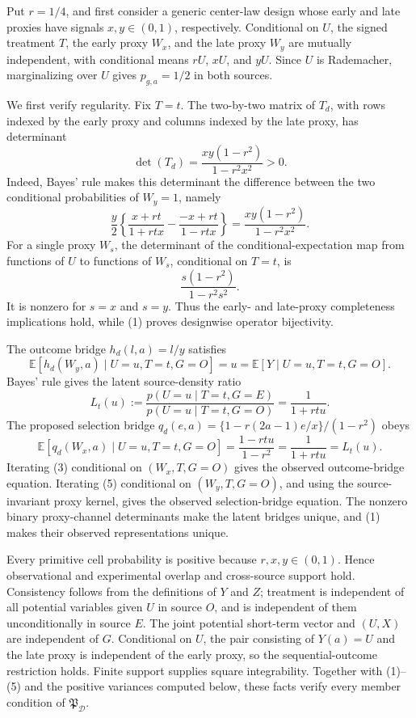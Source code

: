 Put \(r=1/4\), and first consider a generic center-law design whose early and late proxies have signals \(x,y\in(0,1)\), respectively. Conditional on \(U\), the signed treatment \(T\), the early proxy \(W_x\), and the late proxy \(W_y\) are mutually independent, with conditional means \(rU\), \(xU\), and \(yU\). Since \(U\) is Rademacher, marginalizing over \(U\) gives \(p_{g,a}=1/2\) in both sources.

We first verify regularity. Fix \(T=t\). The two-by-two matrix of \(T_d\), with rows indexed by the early proxy and columns indexed by the late proxy, has determinant
\[
 \det(T_d)=\frac{xy(1-r^2)}{1-r^2x^2}>0.                   \tag{1}
\]
Indeed, Bayes' rule makes this determinant the difference between the two conditional probabilities of \(W_y=1\), namely
\[
 \frac y2\left\{
 \frac{x+rt}{1+rtx}-\frac{-x+rt}{1-rtx}
 \right\}
 =\frac{xy(1-r^2)}{1-r^2x^2}.
\]
For a single proxy \(W_s\), the determinant of the conditional-expectation map from functions of \(U\) to functions of \(W_s\), conditional on \(T=t\), is
\[
 \frac{s(1-r^2)}{1-r^2s^2}.                                \tag{2}
\]
It is nonzero for \(s=x\) and \(s=y\). Thus the early- and late-proxy completeness implications hold, while (1) proves designwise operator bijectivity.

The outcome bridge \(h_d(l,a)=l/y\) satisfies
\[
 \mathbb E[h_d(W_y,a)\mid U=u,T=t,G=O]=u
 =\mathbb E[Y\mid U=u,T=t,G=O].                            \tag{3}
\]
Bayes' rule gives the latent source-density ratio
\[
 L_t(u):=\frac{p(U=u\mid T=t,G=E)}{p(U=u\mid T=t,G=O)}
 =\frac1{1+rtu}.                                            \tag{4}
\]
The proposed selection bridge \(q_d(e,a)=\{1-r(2a-1)e/x\}/(1-r^2)\) obeys
\[
 \mathbb E[q_d(W_x,a)\mid U=u,T=t,G=O]
 =\frac{1-rtu}{1-r^2}
 =\frac1{1+rtu}=L_t(u).                                     \tag{5}
\]
Iterating (3) conditional on \((W_x,T,G=O)\) gives the observed outcome-bridge equation. Iterating (5) conditional on \((W_y,T,G=O)\), and using the source-invariant proxy kernel, gives the observed selection-bridge equation. The nonzero binary proxy-channel determinants make the latent bridges unique, and (1) makes their observed representations unique.

Every primitive cell probability is positive because \(r,x,y\in(0,1)\). Hence observational and experimental overlap and cross-source support hold. Consistency follows from the definitions of \(Y\) and \(Z\); treatment is independent of all potential variables given \(U\) in source \(O\), and is independent of them unconditionally in source \(E\). The joint potential short-term vector and \((U,X)\) are independent of \(G\). Conditional on \(U\), the pair consisting of \(Y(a)=U\) and the late proxy is independent of the early proxy, so the sequential-outcome restriction holds. Finite support supplies square integrability. Together with (1)--(5) and the positive variances computed below, these facts verify every member condition of \(\mathfrak P_{\mathcal D}\).

